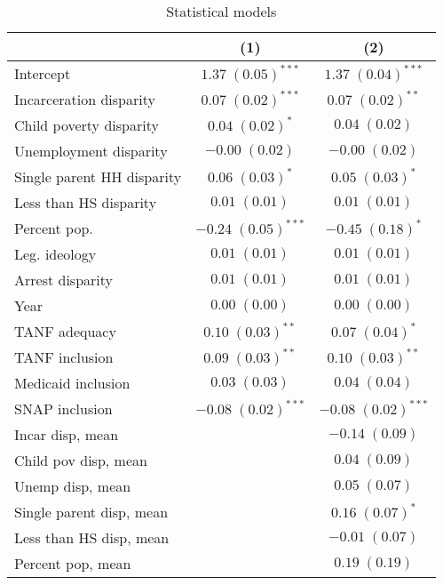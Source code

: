 
\begin{table}
\caption{Statistical models}
\begin{center}
\begin{tabular}{l c c }
\hline
 & (1) & (2) \\
\hline
Intercept                  & $1.37 \; (0.05)^{***}$  & $1.37 \; (0.04)^{***}$  \\
Incarceration disparity    & $0.07 \; (0.02)^{***}$  & $0.07 \; (0.02)^{**}$   \\
Child poverty disparity    & $0.04 \; (0.02)^{*}$    & $0.04 \; (0.02)$        \\
Unemployment disparity     & $-0.00 \; (0.02)$       & $-0.00 \; (0.02)$       \\
Single parent HH disparity & $0.06 \; (0.03)^{*}$    & $0.05 \; (0.03)^{*}$    \\
Less than HS disparity     & $0.01 \; (0.01)$        & $0.01 \; (0.01)$        \\
Percent pop.               & $-0.24 \; (0.05)^{***}$ & $-0.45 \; (0.18)^{*}$   \\
Leg. ideology              & $0.01 \; (0.01)$        & $0.01 \; (0.01)$        \\
Arrest disparity           & $0.01 \; (0.01)$        & $0.01 \; (0.01)$        \\
Year                       & $0.00 \; (0.00)$        & $0.00 \; (0.00)$        \\
TANF adequacy              & $0.10 \; (0.03)^{**}$   & $0.07 \; (0.04)^{*}$    \\
TANF inclusion             & $0.09 \; (0.03)^{**}$   & $0.10 \; (0.03)^{**}$   \\
Medicaid inclusion         & $0.03 \; (0.03)$        & $0.04 \; (0.04)$        \\
SNAP inclusion             & $-0.08 \; (0.02)^{***}$ & $-0.08 \; (0.02)^{***}$ \\
Incar disp, mean           &                         & $-0.14 \; (0.09)$       \\
Child pov disp, mean       &                         & $0.04 \; (0.09)$        \\
Unemp disp, mean           &                         & $0.05 \; (0.07)$        \\
Single parent disp, mean   &                         & $0.16 \; (0.07)^{*}$    \\
Less than HS disp, mean    &                         & $-0.01 \; (0.07)$       \\
Percent pop, mean          &                         & $0.19 \; (0.19)$        \\

\end{tabular}
\end{center}
\end{table}
